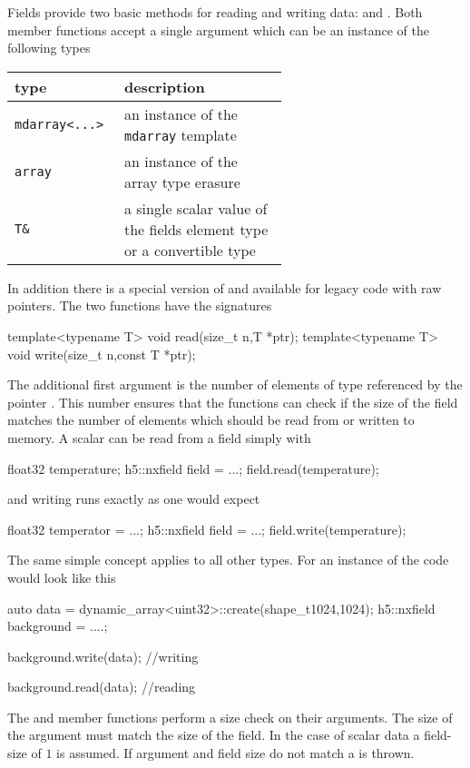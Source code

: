 Fields provide two basic methods for reading and writing data:  and
. Both member functions accept a single argument which can be an
instance of the following types
\begin{center}
    \begin{tabular}{l|p{0.6\linewidth}}
        {\bf type} & {\bf description} \\
        \hline
        \hline
        {\tt mdarray<...>} & an instance of the {\tt mdarray} template \\
        \hline
        {\tt array} & an instance of the array type erasure \\
        \hline
        {\tt T\& } & a single scalar value of the fields element type or a 
        convertible type \\
        \hline
    \end{tabular}
\end{center}
In addition there is a special version of  and 
available for legacy code with raw pointers. The two functions have the
signatures
\begin{cppcode}
template<typename T> void read(size_t n,T *ptr);
template<typename T> void write(size_t n,const T *ptr);
\end{cppcode}
The additional first argument  is the number of elements of type 
referenced by the pointer . This number ensures that the functions 
can check if the size of the field matches the number of elements which should
be read from or written to memory.
A scalar can be read from a field simply with
\begin{cppcode}
float32 temperature; 
h5::nxfield field = ...;
field.read(temperature);
\end{cppcode}
and writing runs exactly as one would expect
\begin{cppcode}
float32 temperator = ...;
h5::nxfield field = ...;
field.write(temperature);
\end{cppcode}
The same simple concept applies to all other types. For an instance of 
 the code would look like this
\begin{cppcode}
auto data = dynamic_array<uint32>::create(shape_t{1024,1024});
h5::nxfield background = ....;

background.write(data); //writing

background.read(data);  //reading
\end{cppcode}

The  and  member functions perform a size check on
their arguments. The size of the argument must match the size of the field. 
In the case of scalar data a field-size of $1$ is assumed. If argument and field
size do not match a  is thrown.


